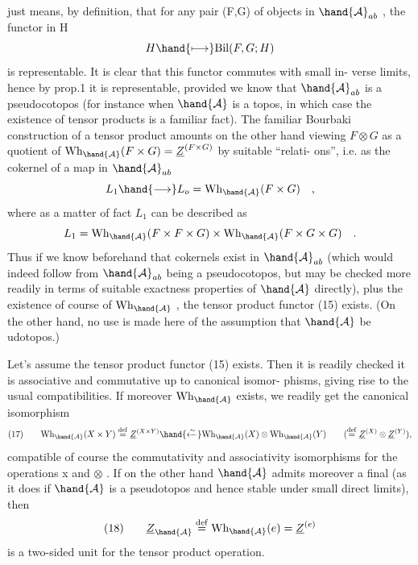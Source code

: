 
just means, by definition, that for any pair (F,G) of objects in $\hand{\mathcal{A}}_{ab}$ ,
the functor in H
\[ H \hand{\longmapsto} \mathrm{Bil}(F,G;H) \]
is representable. It is clear that this functor commutes with small in-%
verse limits, hence by prop.1 it is representable, provided we know
that $\hand{\mathcal{A}}_{ab}$ is a pseudocotopos (for instance when $\hand{\mathcal{A}}$ is a topos, in which
case the existence of tensor products is  a familiar fact). The familiar
Bourbaki construction of a tensor product amounts on the other hand  
viewing  $F\otimes G$ as a quotient of $\mathrm{Wh}_{\hand{\mathcal{A}}}(F\times G) = \underline{Z}^{(F\times G)}$ by suitable ``relati-%
ons'', i.e. as the cokernel of a map in $\hand{\mathcal{A}}_{ab}$
\[ L_1 \hand{\longrightarrow} L_o = \mathrm{Wh}_{\hand{\mathcal{A}}}(F\times G) \quad , \]
where as a matter of fact $L_1$ can be described as
\[ L_1 = \mathrm{Wh}_{\hand{\mathcal{A}}}(F\times F\times G) \times \mathrm{Wh}_{\hand{\mathcal{A}}}(F\times G\times G) \quad . \]
Thus if we know beforehand that cokernels exist in $\hand{\mathcal{A}}_{ab}$ (which would
indeed follow from $\hand{\mathcal{A}}_{ab}$ being a pseudocotopos, but  may be checked
more readily in terms of suitable exactness properties of $\hand{\mathcal{A}}$ directly),
plus the existence of course of $\mathrm{Wh}_{\hand{\mathcal{A}}}$ , the tensor product functor (15)
exists. (On the other hand, no use is made here of the assumption that
$\hand{\mathcal{A}}$ be udotopos.)

Let's assume the tensor product functor (15) exists. Then it is
readily checked it is associative and commutative up to canonical isomor-%
phisms, giving rise to the usual compatibilities. If moreover $\mathrm{Wh}_{\hand{\mathcal{A}}}$
exists, we readily get the canonical isomorphism
\[ (17) \qquad \mathrm{Wh}_{\hand{\mathcal{A}}}(X\times Y) \overset{\mathrm{def}}{=} \underline{Z}^{(X\times Y)} \hand{\xleftarrow{\sim}} \mathrm{Wh}_{\hand{\mathcal{A}}}(X)\otimes\mathrm{Wh}_{\hand{\mathcal{A}}}(Y) \qquad ( \overset{\mathrm{def}}{=} \underline{Z}^{(X)}\otimes\underline{Z}^{(Y)} ), \]
compatible of course  the commutativity and associativity isomorphisms
for the operations x and $\otimes$ . If on the other hand $\hand{\mathcal{A}}$ admits moreover
a final  (as it does if $\hand{\mathcal{A}}$ is a pseudotopos and hence stable under
small direct limits), then
\[ (18) \qquad \underline{Z}_{\hand{\mathcal{A}}} \overset{\mathrm{def}}{=} \mathrm{Wh}_{\hand{\mathcal{A}}}(e) = \underline{Z}^{(e)} \]
is a two-sided unit for the tensor product operation.

